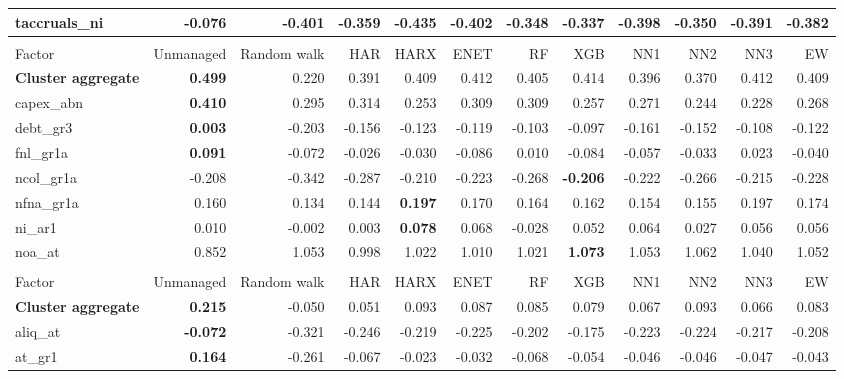 \begin{landscape}
\begin{longtable}{>{\raggedright\arraybackslash}p{2.6cm}rrrrrrrrrrr}
taccruals\_ni & \textbf{-0.076} & -0.401 & -0.359 & -0.435 & -0.402 & -0.348 & -0.337 & -0.398 & -0.350 & -0.391 & -0.382 \\
\hline
\multicolumn{12}{@{}l}{\textit{Panel B. Debt Issuance}} \\
\hline
Factor & Unmanaged & Random walk & HAR & HARX & ENET & RF & XGB & NN1 & NN2 & NN3 & EW \\
\hline
\textbf{Cluster aggregate} & \textbf{0.499} & 0.220 & 0.391 & 0.409 & 0.412 & 0.405 & 0.414 & 0.396 & 0.370 & 0.412 & 0.409 \\
capex\_abn & \textbf{0.410} & 0.295 & 0.314 & 0.253 & 0.309 & 0.309 & 0.257 & 0.271 & 0.244 & 0.228 & 0.268 \\
debt\_gr3 & \textbf{0.003} & -0.203 & -0.156 & -0.123 & -0.119 & -0.103 & -0.097 & -0.161 & -0.152 & -0.108 & -0.122 \\
fnl\_gr1a & \textbf{0.091} & -0.072 & -0.026 & -0.030 & -0.086 & 0.010 & -0.084 & -0.057 & -0.033 & 0.023 & -0.040 \\
ncol\_gr1a & -0.208 & -0.342 & -0.287 & -0.210 & -0.223 & -0.268 & \textbf{\cellcolor{blue!10}-0.206} & -0.222 & -0.266 & -0.215 & -0.228 \\
nfna\_gr1a & 0.160 & 0.134 & 0.144 & \textbf{\cellcolor{blue!10}0.197} & \cellcolor{blue!10}0.170 & \cellcolor{blue!10}0.164 & \cellcolor{blue!10}0.162 & 0.154 & 0.155 & \cellcolor{blue!10}0.197 & \cellcolor{blue!10}0.174 \\
ni\_ar1 & 0.010 & -0.002 & 0.003 & \textbf{\cellcolor{blue!10}0.078} & \cellcolor{blue!10}0.068 & -0.028 & \cellcolor{blue!10}0.052 & \cellcolor{blue!10}0.064 & \cellcolor{blue!10}0.027 & \cellcolor{blue!10}0.056 & \cellcolor{blue!10}0.056 \\
noa\_at & 0.852 & 1.053 & 0.998 & 1.022 & 1.010 & 1.021 & \textbf{\cellcolor{blue!10}1.073} & 1.053 & \cellcolor{blue!10}1.062 & 1.040 & 1.052 \\
\hline
\multicolumn{12}{@{}l}{\textit{Panel C. Investment}} \\
\hline
Factor & Unmanaged & Random walk & HAR & HARX & ENET & RF & XGB & NN1 & NN2 & NN3 & EW \\
\hline
\textbf{Cluster aggregate} & \textbf{0.215} & -0.050 & 0.051 & 0.093 & 0.087 & 0.085 & 0.079 & 0.067 & 0.093 & 0.066 & 0.083 \\
aliq\_at & \textbf{-0.072} & -0.321 & -0.246 & -0.219 & -0.225 & -0.202 & -0.175 & -0.223 & -0.224 & -0.217 & -0.208 \\
at\_gr1 & \textbf{0.164} & -0.261 & -0.067 & -0.023 & -0.032 & -0.068 & -0.054 & -0.046 & -0.046 & -0.047 & -0.043 \\

\end{longtable}
\end{landscape}
